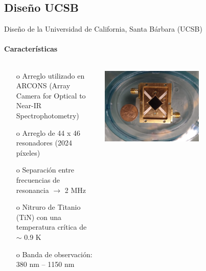 \documentclass[ignorenonframetext,12pt]{beamer}
\begin{document}
\subsection{Diseño UCSB}
\begin{frame}{Diseño de la Universidad de California, Santa Bárbara (UCSB)}
				\framesubtitle{Características}
				\begin{columns}
								\begin{column}{0.49\textwidth}
												\begin{itemize}
																\item[o] Arreglo utilizado en
																				{\color{blue}ARCONS} (Array
																				Camera for Optical to Near-IR
																				Spectrophotometry)
																\item[o] Arreglo de 44 x 46 resonadores (\alert{2024
																				píxeles})
																\item[o] Separación entre frecuencias de
																				resonancia $\to$ \alert{2 MHz}
																\item[o] Nitruro de Titanio (TiN) con una temperatura
																				crítica de \alert{$\sim$ 0.9 K}
																\item[o] Banda de observación: \alert{380 nm --
																				1150 nm}
												\end{itemize}
								\end{column}
								\begin{column}{0.49\textwidth}
												\centering
												\includegraphics[width=0.6\textwidth]{mkid4}

\end{column}
\end{columns}
\end{frame}
\end{document}
